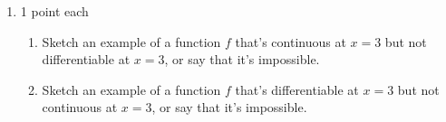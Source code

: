 \documentclass{article}
\begin{document}
\begin{enumerate}
\begin{enumerate}
  \item
    \begin{problem}[0.5in]
      $x = 4$
    \end{problem}

    \begin{solution} %
      $\displaystyle \lim_{x \to 4^-} f(x)$ and $\displaystyle \lim_{x \to 4^+} f(x)$ exist but aren't equal to each other, so $f$ has a  at $x = 4$.
    \end{solution}

  \item
    \begin{problem}[0.5in]
      $x = 5$
    \end{problem}

    \begin{solution} %
      $\displaystyle \lim_{x \to 5} f(x) = -1$, which is equal to $f(5)$, so $f$ is  at $x = 5$.
    \end{solution}

  \end{enumerate}  

\item  \begin{grading}
    1 point each
  \end{grading}

  \begin{enumerate}
  \item

    \begin{problem}[\vfill]
      Sketch an example of a function $f$ that's continuous at $x = 3$ but not differentiable at $x = 3$, or say that it's impossible. 
    \end{problem}

    \begin{solution}
    
    \end{solution}

  \item
    \begin{problem}[\vfill\newpage]
      Sketch an example of a function $f$ that's differentiable at $x = 3$ but not continuous at $x = 3$, or say that it's impossible. 
    \end{problem}


\end{enumerate}
\end{enumerate}
\end{document}
